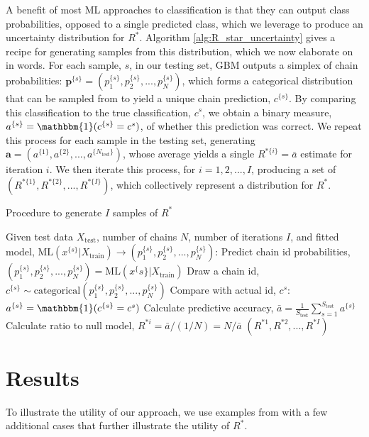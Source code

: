 \documentclass{article}
\begin{document}
A benefit of most ML approaches to classification is that they can output class probabilities, opposed to a single predicted class, which we leverage to produce an uncertainty distribution for $R^*$. Algorithm \ref{alg:R_star_uncertainty} gives a recipe for generating samples from this distribution, which we now elaborate on in words. For each sample, $s$, in our testing set, GBM outputs a simplex of chain probabilities: $\boldsymbol{p}^{\{s\}}=(p_1^{\{s\}},p_2^{\{s\}},...,p_N^{\{s\}})$, which forms a categorical distribution that can be sampled from to yield a unique chain prediction, $c^{\{s\}}$. By comparing this classification to the true classification, $c^s$, we obtain a binary measure, $a^{\{s\}}=\mathbbm{1}(c^{\{s\}}=c^s)$, of whether this prediction was correct. We repeat this process for each sample in the testing set, generating $\boldsymbol{a}=(a^{\{1\}},a^{\{2\}},...,a^{\{N_\text{test}\}})$, whose average yields a single $R^{*\{i\}}=\bar{a}$ estimate for iteration $i$. We then iterate this process, for $i=1,2,...,I$, producing a set of $(R^{*\{1\}},R^{*\{2\}},...,R^{*\{I\}})$, which collectively represent a distribution for $R^*$. 


\begin{algorithm}[tb]
	\caption{Procedure to generate $I$ samples of $R^*$}
	\label{alg:R_star_uncertainty}
	\begin{algorithmic}
		\STATE Given test data $X_\text{test}$, number of chains $N$, number of iterations $I$, and fitted
		\STATE model, $\text{ML}(x^{\{s\}}|X_\text{train})\rightarrow(p_1^{\{s\}},p_2^{\{s\}},...,p_N^{\{s\}})$:
		\STATE Predict chain id probabilities, $(p_1^{\{s\}},p_2^{\{s\}},...,p_N^{\{s\}})= \text{ML}(x^\{s\}|X_\text{train})$
		\STATE Draw a chain id, $c^{\{s\}} \sim \text{categorical}(p_1^{\{s\}},p_2^{\{s\}},...,p_N^{\{s\}})$
		\STATE Compare with actual id, $c^s$: $a^{\{s\}}=\mathbbm{1}(c^{\{s\}}=c^s)$
		\ENDFOR
		\STATE Calculate predictive accuracy, $\bar{a} = \frac{1}{S_\text{test}} \sum_{s=1}^{S_\text{test}} a^{\{s\}}$
		\STATE Calculate ratio to null model, $R^{*i} = \bar{a} / (1 / N) = N/\bar{a}$
		\ENDFOR
		\RETURN $(R^{*1},R^{*2},...,R^{*I})$
	\end{algorithmic}
\end{algorithm}

\section{Results}\label{sec:results}
To illustrate the utility of our approach, we use examples from \cite{vehtari2019rank} with a few additional cases that further illustrate the utility of $R^*$.
\end{document}

